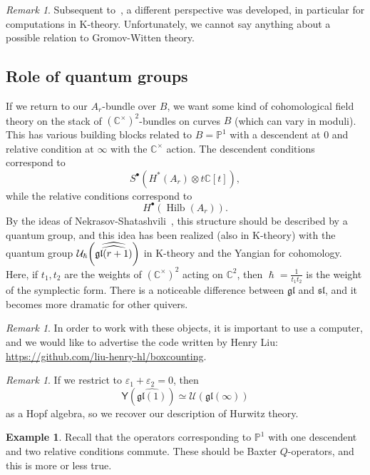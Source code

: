 \documentclass[leqno, openany]{memoir}
\theoremstyle{definition}
\newtheorem{exm}[thm]{Example}
\theoremstyle{remark}
\newtheorem{rmk}[thm]{Remark}
\theoremstyle{plain}
\theoremstyle{definition}
\theoremstyle{remark}
\newcommand{\C}{\mathbb{C}}
\renewcommand{\P}{\mathbb{P}}
\newcommand{\ep}{\varepsilon}
\newcommand{\mc}[1]{\mathcal{#1}}
\newcommand{\mf}[1]{\mathfrak{#1}}
\newcommand{\ms}[1]{\mathsf{#1}}
\newcommand{\wh}[1]{\widehat{#1}}
\DeclareMathOperator{\Hilb}{Hilb}
\begin{document}
\begin{rmk}
    Subsequent to~\cite{moop}, a different perspective was developed, in particular for computations in K-theory. Unfortunately, we cannot say anything about a possible relation to Gromov-Witten theory.
\end{rmk}

\subsection{Role of quantum groups}

If we return to our $A_r$-bundle over $B$, we want some kind of cohomological field theory on the stack of $(\C^{\times})^2$-bundles on curves $B$ (which can vary in moduli). This has various building blocks related to $B = \P^1$ with a descendent at $0$ and relative condition at $\infty$ with the $\C^{\times}$ action. The descendent conditions correspond to
\[ S^{\bullet}(H^*(A_r) \otimes t \C[t]), \]
while the relative conditions correspond to 
\[ H^{\bullet}(\Hilb(A_r)). \]
By the ideas of Nekrasov-Shatashvili~\cite{nekshat}, this structure should be described by a quantum group, and this idea has been realized (also in K-theory) with the quantum group $\mc{U}_{\hslash}\qty(\wh{\wh{\mf{gl}(r+1)}})$ in K-theory and the Yangian for cohomology. Here, if $t_1, t_2$ are the weights of $(\C^{\times})^2$ acting on $\C^2$, then $\hslash = \frac{1}{t_1 t_2}$ is the weight of the symplectic form. There is a noticeable difference between $\mf{gl}$ and $\mf{sl}$, and it becomes more dramatic for other quivers.

\begin{rmk}
    In order to work with these objects, it is important to use a computer, and we would like to advertise the code written by Henry Liu: \url{https://github.com/liu-henry-hl/boxcounting}.
\end{rmk}

\begin{rmk}
    If we restrict to $\ep_1 + \ep_2 = 0$, then
    \[ \ms{Y}(\wh{\mf{gl}(1)}) \simeq \mc{U}(\mf{gl}(\infty)) \]
    as a Hopf algebra, so we recover our description of Hurwitz theory.
\end{rmk}

\begin{exm}
    Recall that the operators corresponding to $\P^1$ with one descendent and two relative conditions commute. These should be Baxter $Q$-operators, and this is more or less true.
\end{exm}
\end{document}
